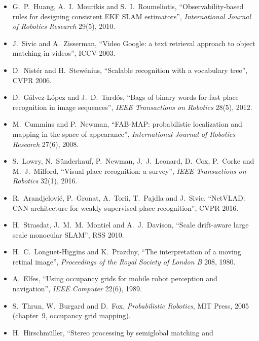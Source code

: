 \begin{description}[leftmargin=1.5em,style=nextline,font=\normalfont]
\begin{itemize}[nosep]
  non-convexity for robust spatial perception'', \emph{IEEE Robotics and
  Automation Letters} 5(2), 2020.
\item G.~P.~Huang, A.~I.~Mourikis and S.~I.~Roumeliotis,
  ``Observability-based rules for designing consistent EKF SLAM
  estimators'', \emph{International Journal of Robotics Research}
  29(5), 2010.
\end{itemize}
\item[Place recognition and loop closure]
\begin{itemize}[nosep]
\item J.~Sivic and A.~Zisserman, ``Video Google: a text retrieval
  approach to object matching in videos'', ICCV 2003.
\item D.~Nist\'er and H.~Stew\'enius, ``Scalable recognition with a
  vocabulary tree'', CVPR 2006.
\item D.~G\'alvez-L\'opez and J.~D.~Tard\'os, ``Bags of binary words for
  fast place recognition in image sequences'', \emph{IEEE Transactions
  on Robotics} 28(5), 2012.
\item M.~Cummins and P.~Newman, ``FAB-MAP: probabilistic localization and
  mapping in the space of appearance'', \emph{International Journal of
  Robotics Research} 27(6), 2008.
\item S.~Lowry, N.~S\"underhauf, P.~Newman, J.~J.~Leonard, D.~Cox,
  P.~Corke and M.~J.~Milford, ``Visual place recognition: a survey'',
  \emph{IEEE Transactions on Robotics} 32(1), 2016.
\item R.~Arandjelovi\'c, P.~Gronat, A.~Torii, T.~Pajdla and J.~Sivic,
  ``NetVLAD: CNN architecture for weakly supervised place recognition'',
  CVPR 2016.
\item H.~Strasdat, J.~M.~M.~Montiel and A.~J.~Davison, ``Scale
  drift-aware large scale monocular SLAM'', RSS 2010.
\item H.~C.~Longuet-Higgins and K.~Prazdny, ``The interpretation of a
  moving retinal image'', \emph{Proceedings of the Royal Society of
  London B} 208, 1980.
\end{itemize}
\item[Dense maps and coverage]
\begin{itemize}[nosep]
\item A.~Elfes, ``Using occupancy grids for mobile robot perception and
  navigation'', \emph{IEEE Computer} 22(6), 1989.
\item S.~Thrun, W.~Burgard and D.~Fox, \emph{Probabilistic Robotics},
  MIT Press, 2005 (chapter~9, occupancy grid mapping).
\item H.~Hirschm\"uller, ``Stereo processing by semiglobal matching and

\end{itemize}
\end{description}
